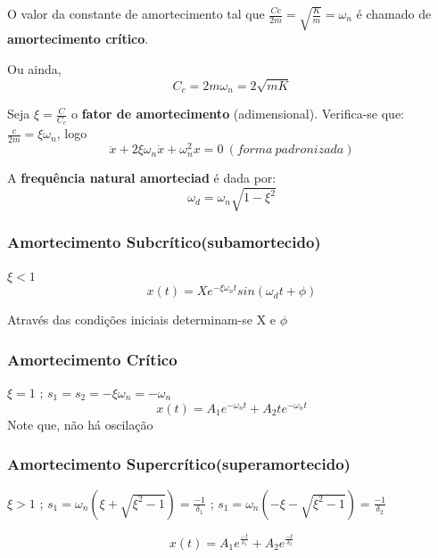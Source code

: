 \documentclass[a4paper, 12pt]{article}
\begin{document}
	O valor da constante de amortecimento tal que $\frac{Cc}{2m} = \sqrt{\frac{K}{m}} = \omega_n$ é chamado de \textbf{amortecimento crítico}.
	
	Ou ainda,
	\begin{equation}
	\boxed{C_c = 2m\omega_n = 2\sqrt{mK}}
	\end{equation}
	
	Seja $\boxed{\xi =\frac{C}{C_c}}$ o \textbf{fator de amortecimento} (adimensional). Verifica-se que: $\frac{c}{2m} = \xi \omega_n$, logo
	\begin{equation}
	\boxed{\ddot{x} + 2 \xi \omega_n \dot{x} + \omega_n^2x = 0 \ (forma\ padronizada)}
	\end{equation}
	
	A \textbf{frequência natural amorteciad} é dada por:
	\begin{equation}
	\boxed{\omega_d = \omega_n \sqrt{1-\xi^2}}
	\end{equation}
	
\subsubsection{Amortecimento Subcrítico(subamortecido)}
	$\xi < 1$\\
	\begin{equation}
	\boxed{x(t) = Xe^{-\xi \omega_n t}sin(\omega_d t + \phi)}
	\end{equation}
	
	Através das condições iniciais determinam-se X e $\phi$
	
\subsubsection{Amortecimento Crítico}
	$\xi = 1$ ; $s_1 = s_2 = -\xi \omega_n = -\omega_n$
	\begin{equation}
	\boxed{x(t) = A_1 e^{-\omega_n t} + A_2 t e^{-\omega_n t}}
	\end{equation}
	Note que, não há oscilação
	
\subsubsection{Amortecimento Supercrítico(superamortecido)}
	$\xi > 1$ ; $s_1 = \omega_n (\xi + \sqrt{\xi^2 - 1}) = \frac{-1}{\delta_1}$ ; $s_1 = \omega_n (-\xi - \sqrt{\xi^2 - 1}) = \frac{-1}{\delta_2}$

	\begin{equation}
	\boxed{x(t) = A_1 e^{\frac{-t}{\delta_1}} + A_2 e^{\frac{-t}{\delta_2}}}
	\end{equation}
	
\end{document}
